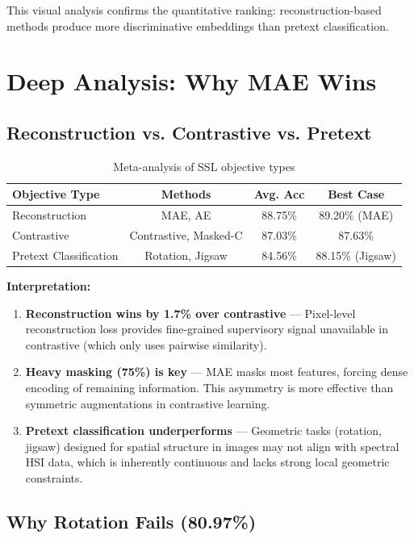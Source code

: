 \documentclass[11pt,a4paper]{article}
\begin{document}
This visual analysis confirms the quantitative ranking: reconstruction-based methods produce more discriminative embeddings than pretext classification.

\section{Deep Analysis: Why MAE Wins}

\subsection{Reconstruction vs. Contrastive vs. Pretext}

\begin{table}[h]
\centering
\small
\caption{Meta-analysis of SSL objective types}
\begin{tabular}{lccc}
\toprule
\textbf{Objective Type} & \textbf{Methods} & \textbf{Avg. Acc} & \textbf{Best Case} \\
\midrule
Reconstruction & MAE, AE & 88.75\% & 89.20\% (MAE) \\
Contrastive & Contrastive, Masked-C & 87.03\% & 87.63\% \\
Pretext Classification & Rotation, Jigsaw & 84.56\% & 88.15\% (Jigsaw) \\
\bottomrule
\end{tabular}
\end{table}

\textbf{Interpretation:}
\begin{enumerate}
    \item \textbf{Reconstruction wins by 1.7\% over contrastive} — Pixel-level reconstruction loss provides fine-grained supervisory signal unavailable in contrastive (which only uses pairwise similarity).
    
    \item \textbf{Heavy masking (75\%) is key} — MAE masks most features, forcing dense encoding of remaining information. This asymmetry is more effective than symmetric augmentations in contrastive learning.
    
    \item \textbf{Pretext classification underperforms} — Geometric tasks (rotation, jigsaw) designed for spatial structure in images may not align with spectral HSI data, which is inherently continuous and lacks strong local geometric constraints.
\end{enumerate}

\subsection{Why Rotation Fails (80.97\%)}
\end{document}
